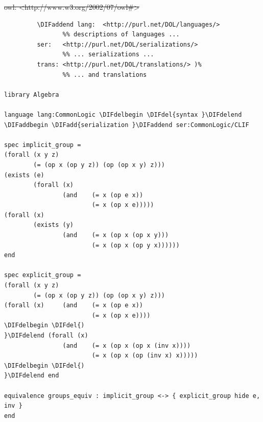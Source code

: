 \documentclass[10pt,fleqn,final]{scrreprt}
\providecommand{\DIFadd}[1]{{\protect\color{blue}\uwave{#1}}} %
\providecommand{\DIFdel}[1]{{\protect\color{red}\sout{#1}}}                      %
\providecommand{\DIFaddbegin}{} %
\providecommand{\DIFaddend}{} %
\providecommand{\DIFdelbegin}{} %
\providecommand{\DIFdelend}{} %
\begin{document}
\DIFdelbegin %
         \DIFdel{owl:   <http://www.w3.org/2002/07/owl#>
         }\DIFdelend \DIFaddbegin \begin{lstlisting}[basicstyle=\ttfamily,language=dolText,alsolanguage=clif,escapechar=@,mathescape]
%DIF > prefix( :      <http://www.example.org/algebra#>
         \DIFaddend lang:  <http://purl.net/DOL/languages/>
                %% descriptions of languages ...
         ser:   <http://purl.net/DOL/serializations/>
                %% ... serializations ...
         trans: <http://purl.net/DOL/translations/> )%
                %% ... and translations

library Algebra

language lang:CommonLogic \DIFdelbegin \DIFdel{syntax }\DIFdelend \DIFaddbegin \DIFadd{serialization }\DIFaddend ser:CommonLogic/CLIF

spec implicit_group =
(forall (x y z)
        (= (op x (op y z)) (op (op x y) z)))
(exists (e)
        (forall (x)
                (and    (= x (op e x))
                        (= x (op x e)))))
(forall (x)
        (exists (y)
                (and    (= x (op x (op x y)))
                        (= x (op x (op y x))))))
end

spec explicit_group =
(forall (x y z)
        (= (op x (op y z)) (op (op x y) z)))
(forall (x)     (and    (= x (op e x))
                        (= x (op x e))))
\DIFdelbegin \DIFdel{)
}\DIFdelend (forall (x)
                (and    (= x (op x (op x (inv x))))
                        (= x (op x (op (inv x) x)))))
\DIFdelbegin \DIFdel{)
}\DIFdelend end

equivalence groups_equiv : implicit_group <-> { explicit_group hide e, inv }
end
\end{lstlisting}
\end{document}
